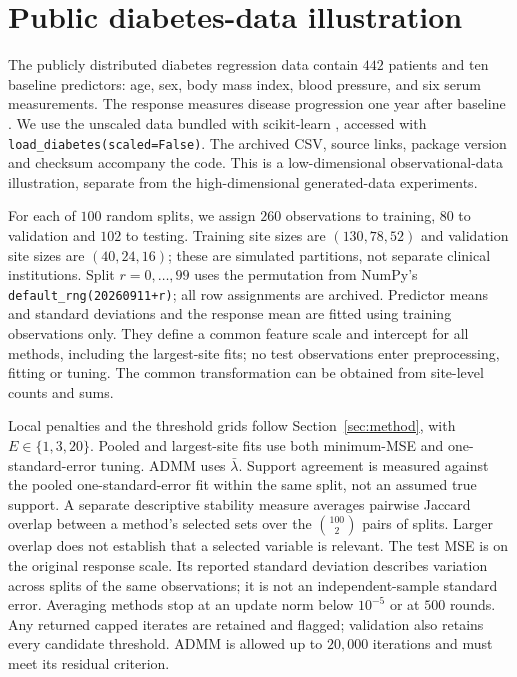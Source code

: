 \section{Public diabetes-data illustration}
\label{sec:publicdata}

The publicly distributed diabetes regression data contain $442$ patients
and ten baseline predictors: age, sex, body mass index, blood pressure,
and six serum measurements. The response measures disease progression
one year after baseline \citep{efron2004}. We use the unscaled data bundled
with scikit-learn \citep{pedregosa2011}, accessed with
\texttt{load\_diabetes(scaled=False)}. The archived CSV, source links,
package version and checksum accompany the code.
This is a low-dimensional observational-data illustration, separate from
the high-dimensional generated-data experiments.

For each of $100$ random splits, we assign $260$ observations to training,
$80$ to validation and $102$ to testing. Training site sizes are
$(130,78,52)$ and validation site sizes are $(40,24,16)$; these are
simulated partitions, not separate clinical institutions.
Split $r=0,\ldots,99$ uses the permutation from NumPy's
\texttt{default\_rng(20260911+r)}; all row assignments are archived.
Predictor means and standard deviations and the response mean are fitted
using training observations only. They define a common feature scale and
intercept for all methods, including the largest-site fits; no test
observations enter preprocessing, fitting or tuning. The common
transformation can be obtained from site-level counts and sums.

Local penalties and the threshold grids follow
Section~\ref{sec:method}, with $E\in\{1,3,20\}$.
Pooled and largest-site fits use both minimum-MSE and one-standard-error
tuning. ADMM uses $\bar\lambda$.
Support agreement is measured against the pooled one-standard-error fit
within the same split, not an assumed true support. A separate descriptive
stability measure averages pairwise Jaccard overlap between a method's
selected sets over the $\binom{100}{2}$ pairs of splits. Larger overlap
does not establish that a selected variable is relevant.
The test MSE is on the original response scale. Its reported standard
deviation describes variation across splits of the same observations;
it is not an independent-sample standard error. Averaging methods stop at
an update norm below $10^{-5}$ or at $500$ rounds. Any returned capped
iterates are retained and flagged; validation also retains every candidate
threshold. ADMM is allowed up to $20{,}000$ iterations and must meet its
residual criterion.




